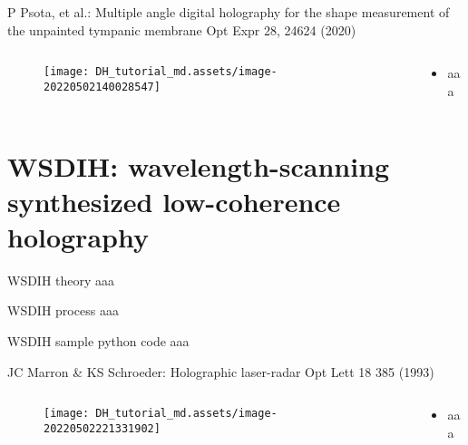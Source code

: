 \documentclass[t, aspectratio=169]{beamer}
\begin{document}
\begin{frame}{P Psota, et al.: Multiple angle digital holography for the shape measurement of the unpainted tympanic membrane}
	\vspace{-3 mm}
	\small Opt Expr  28, 24624 (2020)
	\begin{columns}
		\begin{column}{.6\textwidth}
			\begin{figure}
				\texttt{[image: DH\_tutorial\_md.assets/image-20220502140028547]}
			\end{figure}
		\end{column}
		\begin{column}{.4\textwidth}
			\begin{itemize}
				\item aaa
			\end{itemize}
		\end{column}
	\end{columns}
\end{frame}


\section{WSDIH: wavelength-scanning synthesized low-coherence holography}
\begin{frame}[c]
	\centering\LARGE\textbf{\secname}
\end{frame}


\begin{frame}{WSDIH theory}
aaa
\end{frame}


\begin{frame}{WSDIH process}
aaa
\end{frame}


\begin{frame}{WSDIH sample python code}
aaa
\end{frame}


\begin{frame}{JC Marron \& KS Schroeder: Holographic laser-radar}
	\vspace{-3 mm}
	\small Opt Lett 18 385 (1993)
	\begin{columns}
		\begin{column}{.6\textwidth}
			\begin{figure}
				\texttt{[image: DH\_tutorial\_md.assets/image-20220502221331902]}
			\end{figure}
		\end{column}
		\begin{column}{.4\textwidth}
			\begin{itemize}
				\item aaa
			\end{itemize}
		\end{column}
	\end{columns}
\end{frame}
\end{document}
